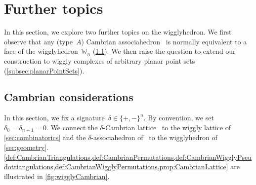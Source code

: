 \documentclass{amsart}
\theoremstyle{definition}
\newcommand{\polytope}[1]{\mathds{#1}} %
\newcommand{\wigglyhedron}{\polytope{W}} %
\begin{document}

\section{Further topics}
\label{sec:furtherTopics}

In this section, we explore two further topics on the wigglyhedron.
We first observe that any (type~$A$) Cambrian associahedron~\cite{Reading-CambrianLattices,HohlwegLange} is normally equivalent to a face of the wigglyhedron~$\wigglyhedron_n$ (\cref{subsec:CambrianConsiderations}).
We then raise the question to extend our construction to wiggly complexes of arbitrary planar point sets (\cref{subsec:planarPointSets}).


\subsection{Cambrian considerations}
\label{subsec:CambrianConsiderations}

In this section, we fix a signature~$\delta \in \{+,-\}^n$. By convention, we set~$\delta_0 = \delta_{n+1} = 0$.
We connect the $\delta$-Cambrian lattice~\cite{Reading-CambrianLattices} to the wiggly lattice of \cref{sec:combinatorics} and the $\delta$-associahedron of~\cite{HohlwegLange} to the wigglyhedron of \cref{sec:geometry}.
\cref{def:CambrianTriangulations,def:CambrianPermutations,def:CambrianWigglyPseudotriangulations,def:CambrianWigglyPermutations,prop:CambrianLattice} are illustrated in \cref{fig:wigglyCambrian}.
\end{document}
